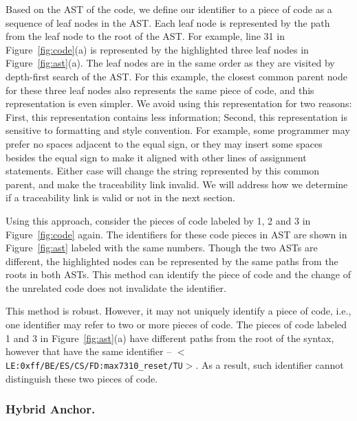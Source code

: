 Based on the AST of the code, we define our identifier to a piece of code as a sequence of leaf nodes in the AST. Each leaf node is represented by the path from the leaf node to the root of the AST. For example, line 31 in Figure~\ref{fig:code}(a) is represented by the highlighted three leaf nodes in Figure~\ref{fig:ast}(a). The leaf nodes are in the same order as they are visited by depth-first search of the AST. For this example, the closest common parent node for these three leaf nodes also represents the same piece of code, and this representation is even simpler. We avoid using this representation for two reasons: First, this representation contains less information; Second, this representation is sensitive to formatting and style convention. For example, some programmer may prefer no spaces adjacent to the equal sign, or they may insert some spaces besides the equal sign to make it aligned with other lines of assignment statements. Either case will change the string represented by this common parent, and make the traceability link invalid. We will address how we determine if a traceability link is valid or not in the next section.

Using this approach, consider the pieces of code labeled by 1, 2 and 3 in Figure~\ref{fig:code} again. The identifiers for these code pieces in AST are shown in Figure~\ref{fig:ast} labeled with the same numbers.
Though the two ASTs are different,
the highlighted nodes can be represented by the same paths from the roots in both ASTs.
This method can identify the piece of code and the change of the unrelated code does not invalidate the identifier.

This method is robust. However, it may not uniquely identify a piece of code, i.e., one identifier may refer to two or more pieces of code.
The pieces of code labeled 1 and 3 in Figure~\ref{fig:ast}(a) have different paths from the root of the syntax, however that have the same 
identifier -- $<$\texttt{LE:0xff/BE/ES/CS/FD:max7310\_reset/TU}$>$. As a result, such identifier cannot distinguish these two pieces of code. 

\subsubsection{Hybrid Anchor.}

